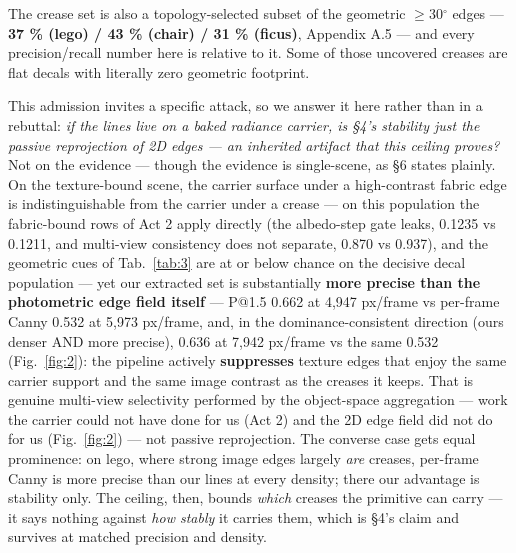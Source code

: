 The crease set is also a topology-selected subset of the geometric $\geq$30$^{\circ}$ edges --- \textbf{37 \%
(lego) / 43 \% (chair) / 31 \% (ficus)}, Appendix A.5 --- and every precision/recall number
here is relative to it.
Some of those uncovered creases are flat decals with literally zero geometric footprint.

This admission invites a specific attack, so we answer it here rather than in a rebuttal:
\emph{if the lines live on a baked radiance carrier, is \S4's stability just the passive
reprojection of 2D edges --- an inherited artifact that this ceiling proves?} Not on the
evidence --- though the evidence is single-scene, as \S6 states plainly. On the texture-bound scene,
the carrier surface under a high-contrast fabric edge is indistinguishable from the
carrier under a crease --- on this population the fabric-bound rows of Act 2 apply directly
(the albedo-step gate leaks, 0.1235 vs 0.1211, and multi-view consistency does not
separate, 0.870 vs 0.937), and the geometric cues of Tab.~\ref{tab:3} are at or below chance on the
decisive decal population --- yet our extracted set is substantially \textbf{more precise than the photometric edge field
itself} --- P@1.5 0.662 at 4,947 px/frame vs per-frame Canny 0.532 at 5,973 px/frame, and,
in the dominance-consistent direction (ours denser AND more precise), 0.636 at 7,942
px/frame vs the same 0.532 (Fig.~\ref{fig:2}): the pipeline actively \textbf{suppresses} texture edges that enjoy the
same carrier support and the same image contrast as the creases it keeps. That is genuine
multi-view selectivity performed by the object-space aggregation --- work the carrier could
not have done for us (Act 2) and the 2D edge field did not do for us (Fig.~\ref{fig:2}) --- not passive
reprojection. The converse case gets equal prominence: on lego, where strong image edges
largely \emph{are} creases, per-frame Canny is more precise than our lines at every density;
there our advantage is stability only. The ceiling, then, bounds \emph{which} creases
the primitive can carry --- it says nothing against \emph{how stably} it carries them, which is
\S4's claim and survives at matched precision and density.

